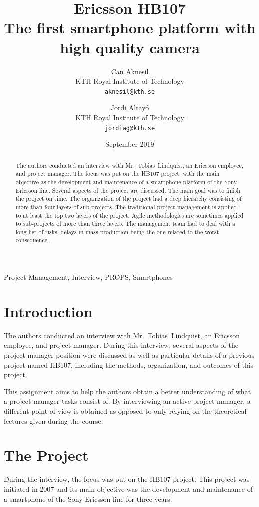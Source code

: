 \documentclass[conference]{IEEEtran}
\title{Ericsson HB107\\[1ex]\LARGE{The first smartphone platform with high quality camera}}
\author{
    Can Aknesil\\KTH Royal Institute of Technology\\\texttt{aknesil@kth.se}
    
    \and
    
    Jordi Altayó\\KTH Royal Institute of Technology\\\texttt{jordiag@kth.se}
    }
\date{September 2019}
\begin{document}
\maketitle
\begin{abstract}
The authors conducted an interview with Mr.~Tobias~Lindquist, an Ericsson employee, and project manager. 
The focus was put on the HB107 project, with the main objective as the development and maintenance of a smartphone platform of the Sony Ericsson line. Several aspects of the project are discussed. The main goal was to finish the project on time. The organization of the project had a deep hierarchy consisting of more than four layers of sub-projects. The traditional project management is applied to at least the top two layers of the project. Agile methodologies are sometimes applied to sub-projects of more than three layers. The management team had to deal with a long list of risks, delays in mass production being the one related to the worst consequence.
\end{abstract}

\begin{IEEEkeywords}
    Project Management, Interview, PROPS, Smartphones
\end{IEEEkeywords}

\section{Introduction}
The authors conducted an interview with Mr.~Tobias~Lindquist, an Ericsson employee, and project manager. During this interview, several aspects of the project manager position were discussed as well as particular details of a previous project named HB107, including the methods, organization, and outcomes of this project. 

This assignment aims to help the authors obtain a better understanding of what a project manager tasks consist of. By interviewing an active project manager, a different point of view is obtained as opposed to only relying on the theoretical lectures given during the course.

\section{The Project}
During the interview, the focus was put on the HB107 project. This project was initiated in 2007 and its main objective was the development and maintenance of a smartphone of the Sony Ericsson line for three years.
\end{document}
